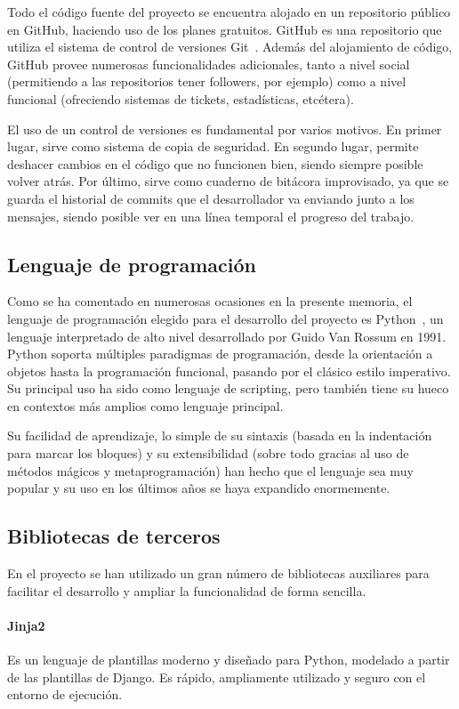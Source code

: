 Todo el código fuente del proyecto se encuentra alojado en un repositorio público
en GitHub, haciendo uso de los planes gratuitos. GitHub es una repositorio que
utiliza el sistema de control de versiones Git~\cite{git}. Además del alojamiento de
código, GitHub provee numerosas funcionalidades adicionales, tanto a nivel
social (permitiendo a las repositorios tener followers, por ejemplo) como a nivel funcional
(ofreciendo sistemas de tickets, estadísticas, etcétera).

El uso de un control de versiones es fundamental por varios motivos. En primer
lugar, sirve como sistema de copia de seguridad. En segundo lugar, permite deshacer
cambios en el código que no funcionen bien, siendo siempre posible volver
atrás. Por último, sirve como cuaderno de bitácora improvisado, ya que se guarda
el historial de commits que el desarrollador va enviando junto a los mensajes,
siendo posible ver en una línea temporal el progreso del trabajo.

\subsection{Lenguaje de programación}

Como se ha comentado en numerosas ocasiones en la presente memoria, el lenguaje
de programación elegido para el desarrollo del proyecto es Python~\cite{python}, un
lenguaje interpretado de alto nivel desarrollado por Guido Van Rossum en 1991.
Python soporta múltiples paradigmas de programación, desde la orientación a objetos
hasta la programación funcional, pasando por el clásico estilo imperativo. Su
principal uso ha sido como lenguaje de scripting, pero también tiene su hueco en
contextos más amplios como lenguaje principal.

Su facilidad de aprendizaje, lo simple de su sintaxis (basada en la indentación
para marcar los bloques) y su extensibilidad (sobre todo gracias al uso de métodos
mágicos y metaprogramación) han hecho que el lenguaje sea muy popular y su uso
en los últimos años se haya expandido enormemente.

\subsection{Bibliotecas de terceros}

En el proyecto se han utilizado un gran número de bibliotecas auxiliares para
facilitar el desarrollo y ampliar la funcionalidad de forma sencilla.

\paragraph{Jinja2~\cite{jinja}}
Es un lenguaje de plantillas moderno y diseñado para Python, modelado a partir de las plantillas de Django.
Es rápido, ampliamente utilizado y seguro con el entorno de ejecución.

